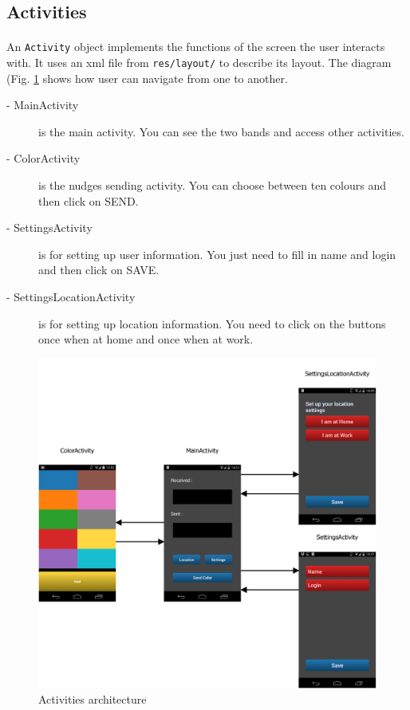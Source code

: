 \documentclass[12pt]{article}
\begin{document}
\subsection{Activities}
\paragraph{}An \verb?Activity? object implements the functions of the screen the user interacts with. It uses an xml file from \verb?res/layout/? to describe its layout. The diagram (Fig. \ref{fig:activity} shows how user can navigate from one to another.

\begin{description}
\item[- MainActivity] is the main activity. You can see the two bands and access other activities.
\item[- ColorActivity] is the nudges sending activity. You can choose between ten colours and then click on SEND.
\item[- SettingsActivity] is for setting up user information. You just need to fill in name and login and then click on SAVE.
\item[- SettingsLocationActivity] is for setting up location information. You need to click on the buttons once when at home and once when at work.
\end{description}


\begin{figure}[ht]
	\centering
		\includegraphics[width=12cm]{graphs/activity.png}
	\caption{Activities architecture}
	\label{fig:activity}
\end{figure}
\end{document}
